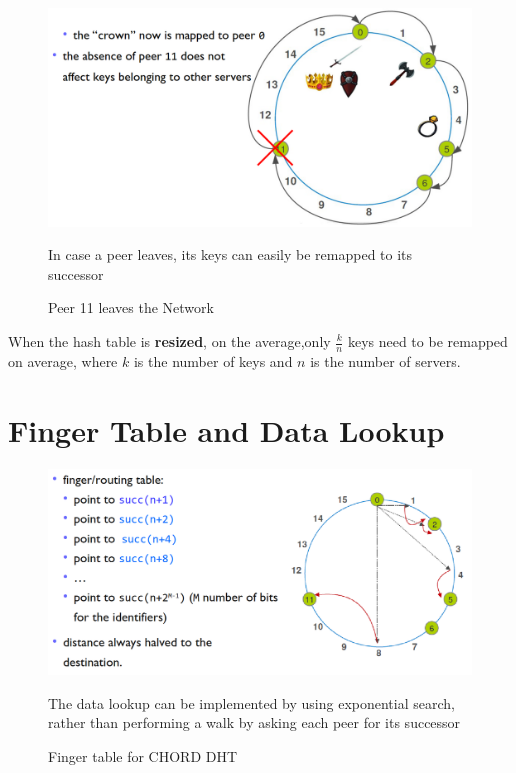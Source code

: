 \begin{figure}[htbp]
   \centering
   \includegraphics{images/p2p_peerleaves.png}
   \caption{Peer 11 leaves the Network}
   \label{fig:p2p_peerleaves}
   In case a peer leaves, its keys can easily be remapped to its successor
\end{figure}

When the hash table is \textbf{resized}, on the average,only $\frac{k}{n}$ keys need to be remapped on average, where $k$ is the number of keys and $n$ is the number of servers.
\newpage
\section{Finger Table and Data Lookup}

\begin{figure}[htbp]
   \centering
   \includegraphics{images/dht_exponentialsearch.png}
   \caption{Finger table for CHORD DHT}
   The data lookup can be implemented by using exponential search, rather than performing a walk by asking each peer for its successor
   \label{fig:dht_exponentialsearch}
\end{figure}

